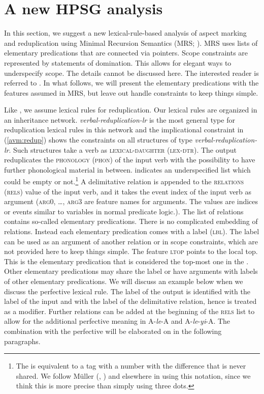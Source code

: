 \section{A new HPSG analysis}\label{sec:analysis}

In this section, we suggest a new lexical-rule-based analysis of aspect marking and reduplication
using Minimal Recursion Semantics (MRS; \citealt{Copestakeetal2005}). %
MRS uses lists of elementary predications that are connected via pointers. Scope constraints are
represented by statements of domination. This allows for elegant ways to underspecify scope. The
details cannot be discussed here. The interested reader is referred to \citet{Copestakeetal2005}. In
what follows, we will present the elementary predications with the features assumed in MRS, but leave
out handle constraints to keep things simple.

Like \citet{FanSongBond2015}, we assume lexical rules for reduplication. Our lexical rules are
organized in an inheritance network. \textit{verbal-reduplication-lr} is the most general type for
reduplication lexical rules in this network and the implicational constraint in (\ref{avm:redup}) shows the constraints on all
structures of type \textit{verbal-reduplication-lr}. Such structures take a verb as
\textsc{lexical-daughter (lex-dtr)}.  The output reduplicates the \textsc{phonology (phon)} of the
input verb with the possibility to have further phonological material in between.  \etag{} indicates
an underspecified list which could be empty or not.\footnote{%
The \etag is equivalent to a tag with a number with the difference that \etag is never shared. We
follow Müller (\citeyear[161]{Mueller2002b}, \citeyear[294]{Mueller2003e}) and elsewhere in using this
notation, since we think this is more
precise than simply using three dots.}
A delimitative relation is appended to the
\textsc{relations (rels)} value of the input verb, and it takes the event index of the input verb  as
argument (\textsc{arg0}, \ldots, \textsc{arg3} are feature names for arguments. The values are
indices or events similar to variables in normal predicate logic.). The list of relations contains so-called elementary predications. There is no complicated
embedding of relations. Instead each elementary predication comes with a label (\textsc{lbl}). The
label can be used as an argument of another relation or in scope constraints, which are not provided
here to keep things simple. The feature \textsc{ltop} points to the local top. This is the
elementary predication that is considered the top-most one in the \relsl. Other elementary
predications may share the label or have arguments with labels of other elementary predications. We
will discuss an example below when we discuss the perfective lexical rule.
The label of the output  is identified with the label of the input and with the
label of the delimitative relation, hence  is treated as a modifier.  Further
relations can be added at the beginning of the \textsc{rels} list to allow for the additional
perfective meaning in A-\textit{le}-A and A-\textit{le}-\textit{yi}-A.  The combination with the
perfective will be elaborated on in the following paragraphs.


